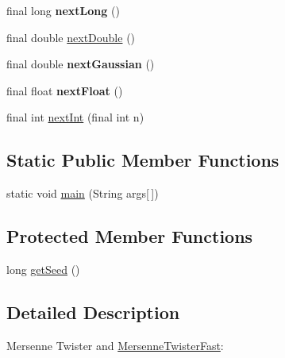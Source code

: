 \begin{DoxyCompactItemize}
\item 
\hypertarget{classjenes_1_1utils_1_1_mersenne_twister_fast_a1de4f36e5e4035569bbb79bb06d4e9c7}{final long {\bfseries next\-Long} ()}\label{classjenes_1_1utils_1_1_mersenne_twister_fast_a1de4f36e5e4035569bbb79bb06d4e9c7}

\item 
final double \hyperlink{classjenes_1_1utils_1_1_mersenne_twister_fast_a64238ab497c1e504c798355f682ea2b9}{next\-Double} ()
\item 
\hypertarget{classjenes_1_1utils_1_1_mersenne_twister_fast_a4af0dd9a4366e476e4d45568cbb558e9}{final double {\bfseries next\-Gaussian} ()}\label{classjenes_1_1utils_1_1_mersenne_twister_fast_a4af0dd9a4366e476e4d45568cbb558e9}

\item 
\hypertarget{classjenes_1_1utils_1_1_mersenne_twister_fast_af2d30f1dec2a94ca26a3b1ccc0624ce9}{final float {\bfseries next\-Float} ()}\label{classjenes_1_1utils_1_1_mersenne_twister_fast_af2d30f1dec2a94ca26a3b1ccc0624ce9}

\item 
final int \hyperlink{classjenes_1_1utils_1_1_mersenne_twister_fast_ae66ea69e37e4866fbb3beecb4e66577a}{next\-Int} (final int n)
\end{DoxyCompactItemize}
\subsection*{Static Public Member Functions}
\begin{DoxyCompactItemize}
\item 
static void \hyperlink{classjenes_1_1utils_1_1_mersenne_twister_fast_a5c955ea4cf1b925290dd92ddecc0c510}{main} (String args\mbox{[}$\,$\mbox{]})
\end{DoxyCompactItemize}
\subsection*{Protected Member Functions}
\begin{DoxyCompactItemize}
\item 
long \hyperlink{classjenes_1_1utils_1_1_mersenne_twister_fast_a88963c0469e0bad7a1834469cf0f7a10}{get\-Seed} ()
\end{DoxyCompactItemize}


\subsection{Detailed Description}
Mersenne Twister and \hyperlink{classjenes_1_1utils_1_1_mersenne_twister_fast}{Mersenne\-Twister\-Fast}\-: 


